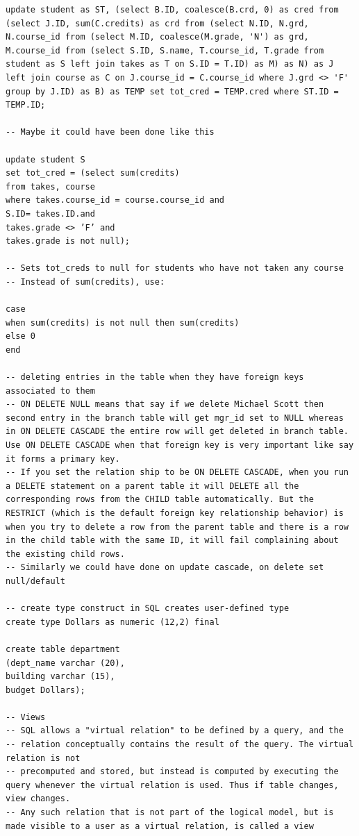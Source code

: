 \documentclass[8pt, a4paper, oneside, twocolumn]{extarticle}
\begin{document}
\begin{verbatim}
update student as ST, (select B.ID, coalesce(B.crd, 0) as cred from (select J.ID, sum(C.credits) as crd from (select N.ID, N.grd, N.course_id from (select M.ID, coalesce(M.grade, 'N') as grd, M.course_id from (select S.ID, S.name, T.course_id, T.grade from student as S left join takes as T on S.ID = T.ID) as M) as N) as J left join course as C on J.course_id = C.course_id where J.grd <> 'F' group by J.ID) as B) as TEMP set tot_cred = TEMP.cred where ST.ID = TEMP.ID;

-- Maybe it could have been done like this

update student S
set tot_cred = (select sum(credits)
from takes, course
where takes.course_id = course.course_id and
S.ID= takes.ID.and
takes.grade <> ’F’ and
takes.grade is not null);

-- Sets tot_creds to null for students who have not taken any course
-- Instead of sum(credits), use:

case
when sum(credits) is not null then sum(credits)
else 0
end

-- deleting entries in the table when they have foreign keys associated to them
-- ON DELETE NULL means that say if we delete Michael Scott then second entry in the branch table will get mgr_id set to NULL whereas in ON DELETE CASCADE the entire row will get deleted in branch table. Use ON DELETE CASCADE when that foreign key is very important like say it forms a primary key.
-- If you set the relation ship to be ON DELETE CASCADE, when you run a DELETE statement on a parent table it will DELETE all the corresponding rows from the CHILD table automatically. But the RESTRICT (which is the default foreign key relationship behavior) is when you try to delete a row from the parent table and there is a row in the child table with the same ID, it will fail complaining about the existing child rows.
-- Similarly we could have done on update cascade, on delete set null/default

-- create type construct in SQL creates user-defined type
create type Dollars as numeric (12,2) final 

create table department
(dept_name varchar (20),
building varchar (15),
budget Dollars);

-- Views
-- SQL allows a "virtual relation" to be defined by a query, and the
-- relation conceptually contains the result of the query. The virtual relation is not
-- precomputed and stored, but instead is computed by executing the query whenever the virtual relation is used. Thus if table changes, view changes.
-- Any such relation that is not part of the logical model, but is made visible to a user as a virtual relation, is called a view


\end{verbatim}
\end{document}
